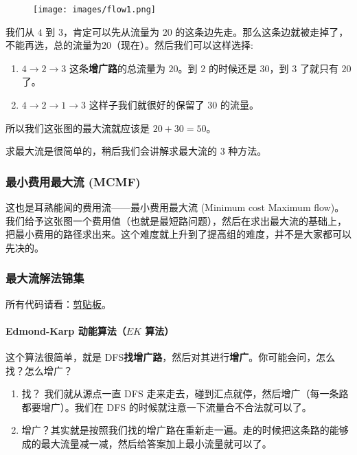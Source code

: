 \begin{figure}[h]
\centering
\texttt{[image: images/flow1.png]} 

\end{figure}

我们从 $4$ 到 $3$，肯定可以先从流量为 $20$ 的这条边先走。那么这条边就被走掉了，不能再选，总的流量为$20$（现在）。然后我们可以这样选择:

\begin{enumerate}
\item $4\rightarrow2\rightarrow3$ 这条\textbf{增广路}的总流量为 $20$。到 $2$ 的时候还是 $30$，到 $3$ 了就只有 $20$ 了。
\item $4\rightarrow2\rightarrow1\rightarrow3$ 这样子我们就很好的保留了 $30$ 的流量。
\end{enumerate}

所以我们这张图的最大流就应该是 $20+30=50$。

求最大流是很简单的，稍后我们会讲解求最大流的 $3$ 种方法。

\subsubsection{最小费用最大流 (MCMF)}

这也是耳熟能闻的费用流——最小费用最大流 (Minimum cost Maximum flow)。我们给予这张图一个费用值（也就是最短路问题），然后在求出最大流的基础上，把最小费用的路径求出来。这个难度就上升到了提高组的难度，并不是大家都可以先决的。

\subsubsection{最大流解法锦集}

所有代码请看：\href{https://www.luogu.org/paste/6t8jgtxc}{剪贴板}。

\paragraph{Edmond-Karp 动能算法（$EK$ 算法）}

这个算法很简单，就是 DFS\textbf{找增广路}，然后对其进行\textbf{增广}。你可能会问，怎么找？怎么增广？

\begin{enumerate}
\item 找？ 我们就从源点一直 DFS 走来走去，碰到汇点就停，然后增广（每一条路都要增广）。我们在 DFS 的时候就注意一下流量合不合法就可以了。
\item 增广？其实就是按照我们找的增广路在重新走一遍。走的时候把这条路的能够成的最大流量减一减，然后给答案加上最小流量就可以了。
\end{enumerate}

